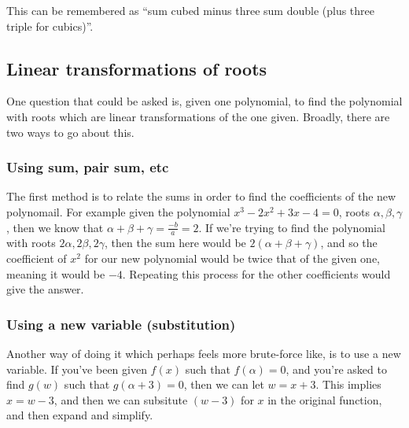 This can be remembered as ``sum cubed minus three sum double (plus three triple for cubics)''.

\subsection{Linear transformations of roots}
One question that could be asked is, given one polynomial, to find the polynomial with roots which are linear transformations of the one given. Broadly, there are two ways to go about this.

\subsubsection{Using sum, pair sum, etc}
The first method is to relate the sums in order to find the coefficients of the new polynomail. For example given the polynomial $x^3-2x^2+3x-4=0$, roots $\alpha, \beta, \gamma$, then we know that $\alpha + \beta + \gamma=\frac{-b}{a}=2$. If we're trying to find the polynomial with roots $2\alpha, 2\beta, 2\gamma$, then the sum here would be $2(\alpha + \beta + \gamma)$, and so the coefficient of $x^2$ for our new polynomial would be twice that of the given one, meaning it would be $-4$. Repeating this process for the other coefficients would give the answer.

\subsubsection{Using a new variable (substitution)}
Another way of doing it which perhaps feels more brute-force like, is to use a new variable. If you've been given $f(x)$ such that $f(\alpha)=0$, and you're asked to find $g(w)$ such that $g(\alpha + 3) = 0$, then we can let $w=x+3$. This implies $x=w-3$, and then we can subsitute $(w-3)$ for $x$ in the original function, and then expand and simplify.
